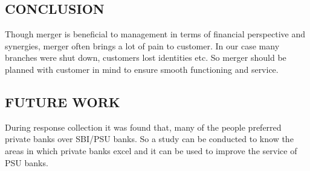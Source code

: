 \documentclass[a4paper, 12pt]{extarticle}
\begin{document}
{\subsection{CONCLUSION}
Though merger is beneficial to management in terms of financial perspective and synergies, merger often brings a lot of pain to customer. In our case many branches were shut down, customers lost identities etc. So merger should be planned with customer in mind to ensure smooth functioning and service.

\subsection{FUTURE WORK}
During response collection it was found that, many of the people preferred private banks over SBI/PSU banks. So a study can be conducted to know the areas in which private banks excel and it can be used to improve the service of PSU banks.


\newpage
}
\end{document}
